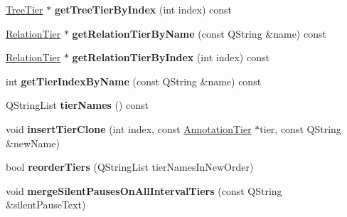 \begin{DoxyCompactItemize}
\hyperlink{class_tree_tier}{Tree\+Tier} $\ast$ {\bfseries get\+Tree\+Tier\+By\+Index} (int index) const
\item 
\mbox{\label{class_annotation_tier_group_a2d8fe2a9050f5aca66bd61ae797f19cb}} 
\hyperlink{class_relation_tier}{Relation\+Tier} $\ast$ {\bfseries get\+Relation\+Tier\+By\+Name} (const Q\+String \&name) const
\item 
\mbox{\label{class_annotation_tier_group_a187b9cfbeb741c78c8469fa300dee887}} 
\hyperlink{class_relation_tier}{Relation\+Tier} $\ast$ {\bfseries get\+Relation\+Tier\+By\+Index} (int index) const
\item 
\mbox{\label{class_annotation_tier_group_ad2c96e89f53ccfab2f667727bc995ec7}} 
int {\bfseries get\+Tier\+Index\+By\+Name} (const Q\+String \&name) const
\item 
\mbox{\label{class_annotation_tier_group_a9eaf011f0a807f95db993bfe826cffc7}} 
Q\+String\+List {\bfseries tier\+Names} () const
\item 
\mbox{\label{class_annotation_tier_group_a1a45061aa5edd02b0fe4fcf832c63911}} 
void {\bfseries insert\+Tier\+Clone} (int index, const \hyperlink{class_annotation_tier}{Annotation\+Tier} $\ast$tier, const Q\+String \&new\+Name)
\item 
\mbox{\label{class_annotation_tier_group_a798aa6ba5d352ec09693ced0fe6773d4}} 
bool {\bfseries reorder\+Tiers} (Q\+String\+List tier\+Names\+In\+New\+Order)
\item 
\mbox{\label{class_annotation_tier_group_a2ed5a9803b673f8fdf76de842a45f599}} 
void {\bfseries merge\+Silent\+Pauses\+On\+All\+Interval\+Tiers} (const Q\+String \&silent\+Pause\+Text)
\end{DoxyCompactItemize}

